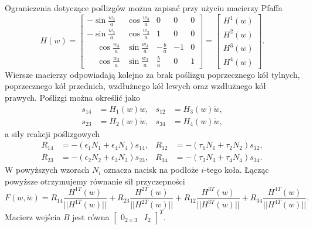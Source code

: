 Ograniczenia dotyczące poślizgów można zapisać przy użyciu macierzy Pfaffa
\begin{equation}
H(w)=\begin{bmatrix}
-\sin\frac{w_3}{a} & \cos\frac{w_3}{a} & 0 & 0 & 0\\
-\sin\frac{w_3}{a} & \cos\frac{w_3}{a} & 1 & 0 & 0\\
\phantom{-}\cos\frac{w_3}{a} & \sin\frac{w_3}{a} & -\frac{b}{a} & -1 & 0\\
 \phantom{-}\cos\frac{w_3}{a} & \sin\frac{w_3}{a} &  \frac{b}{a} &  0 & 1
\end{bmatrix} = \begin{bmatrix}
H^1(w)\\
H^2(w)\\
H^3(w)\\
H^4(w)
\end{bmatrix}.
\end{equation}
Wiersze macierzy odpowiadają kolejno za brak poślizgu poprzecznego kół tylnych, poprzecznego kół przednich, wzdłużnego kół lewych oraz wzdłużnego kół prawych. Poślizgi można określić jako
\begin{equation}
\begin{aligned}
s_{14} &= H_1(w)\dot w, & s_{12} &= H_3(w)\dot w,\\
s_{23} &= H_2(w)\dot w, & s_{34} &= H_4(w)\dot w,
\end{aligned}
\end{equation}
a siły reakcji poślizgowych
\begin{equation}
\begin{aligned}
R_{14}&=-(\epsilon_1 N_1 + \epsilon_4 N_4)s_{14}, & R_{12}&=-(\tau_1 N_1 + \tau_2 N_2)s_{12},\\
R_{23}&=-(\epsilon_2 N_2 + \epsilon_3 N_3)s_{23}, & R_{34}&=-(\tau_3 N_3 + \tau_4 N_4)s_{34}.
\end{aligned}
\end{equation}
W powyższych wzorach $N_i$ oznacza nacisk na podłoże $i$-tego koła. Łącząc powyższe otrzymujemy równanie sił przyczepności
\begin{equation}
F(w, \dot{w}) = R_{14}\frac{H^{1T}(w)}{||H^{1T}(w)||} + R_{23}\frac{H^{2T}(w)}{||H^{2T}(w)||} + R_{12}\frac{H^{3T}(w)}{||H^{3T}(w)||} + R_{34}\frac{H^{4T}(w)}{||H^{4T}(w)||}.
\end{equation}
Macierz wejścia $B$ jest równa $\begin{bmatrix}
0_{2 \times 3} & I_2
\end{bmatrix}^T$.

